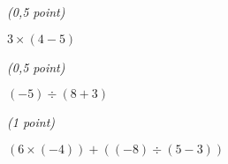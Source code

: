 \documentclass[11pt,a4paper]{article}
\begin{document}
\begin{table}[ht!]
  \centering
  \begin{minipage}{0.25\textwidth}
    \centering

\textit{(0,5 point)}

$ 3 \times (4 - 5) $

  \end{minipage}
  \hfillx
  \begin{minipage}{0.25\textwidth}
    \centering

\textit{(0,5 point)}

$ (-5) \div (8 + 3) $

  \end{minipage}
  \hfillx
  \begin{minipage}{0.50\textwidth}
    \centering

\textit{(1 point)}

$ (6 \times (-4)) + ((-8) \div (5 - 3)) $

  \end{minipage}
\end{table}
\end{document}
